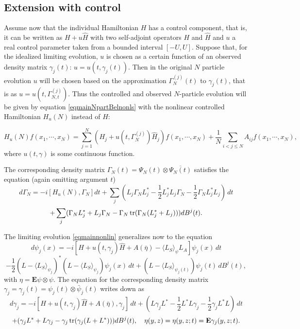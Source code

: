 \documentclass[12pt]{article}
\def\E{\mathbf{E}}
\def\tr{\rm{tr}}
\def\ga{\gamma}
\newcommand{\Ga}{\Gamma}
\begin{document}
\subsection{Extension with control}

Assume now that
the individual Hamiltonian $H$ has a control component, that is, it can be written as $H+u\hat H$ with two self-adjoint
operators $H$ and $\hat H$ and $u$ a real control parameter taken from a bounded interval $[-U,U]$.
 Suppose that, for the idealized limiting evolution, $u$ is chosen as a
 certain function of an observed density matrix $\ga_j(t)$: $u=u(t,\ga_j(t))$.
Then in the original $N$ particle evolution $u$ will be chosen based on the approximation $\Ga^{(j)}_N(t)$ to $\ga_j(t)$,
that is as $u=u(t,\Ga^{(j)}_{N,t})$. Thus the controlled and observed $N$-particle evolution will be given by equation
 \eqref{eqmainNpartBelnonls} with the nonlinear controlled Hamiltonian $H_u(N)$ instead of $H$:

\begin{equation}
\label{eqHambinaryinter1co}
 H_u(N)f(x_1, \cdots , x_N)=\sum_{j=1}^N (H_j+u(t,\Ga^{(j)}_N) \hat H_j)f(x_1, \cdots , x_N)
 + \frac{1}{N}\sum_{i<j\le N} A_{ij}f(x_1, \cdots , x_N),
\end{equation}
where $u(t,\ga)$ is some continuous function.

The corresponding density matrix $\Ga_N(t)=\Psi_N(t)\otimes \overline{\Psi_N(t)}$ satisfies the
equation (again omitting argument $t$)
\[
d \Ga_N
=-i [H_u(N),\Ga_N] dt
+\sum_j (L_j\Ga_N L_j^* -\frac12 L^*_j L_j \Ga_N -\frac12 \Ga_N L^*_j L_j)\, dt
\]
\begin{equation}
\label{eqmainNpartBeldensnonl}
+\sum_j (\Ga_N L_j^*+L_j \Ga_N-\Ga_N \, {\tr} (\Ga_N(L_j^*+L_j))) dB^j(t).
\end{equation}

The limiting evolution \eqref{eqmainnonlin} generalizes now to the equation
\[
d\psi_j(x) =-i[H +u(t,\ga_j)\hat H +A(\bar \eta)
-\langle L_S \rangle_{\psi} L_A]  \psi_j(x) \, dt
\]
\begin{equation}
\label{eqmainnonlinco}
-\frac12 (L-\langle  L_S\rangle_{\psi_j})^* (L-\langle L_S \rangle_{\psi_j}) \psi_j(x)\,dt
+(L-\langle L_S \rangle_{\psi_j(t)})\psi_j(t) \, dB^j(t),
\end{equation}
with $\eta=\E \psi \otimes \psi$.
The equation for the corresponding density matrix $\ga_j=\ga_j(t)=\psi_j(t) \otimes \bar \psi_j(t)$ writes down as
\[
d\ga_j=-i[H+u(t,\ga_j)\hat H+A(\bar \eta), \ga_j] \, dt
+(L\ga_j L^* -\frac12 L^*L \ga_j -\frac12 \ga_j L^*L)\, dt
\]
\begin{equation}
\label{eqmainnonlinpartBel1dens}
+(\ga_j L^*+L \ga_j-\ga_j \, {\tr} (\ga_j(L+L^*))) dB^j(t),
\quad \eta(y,z)=\eta(y,z;t)=\E \ga_j(y,z;t).
\end{equation}
\end{document}
